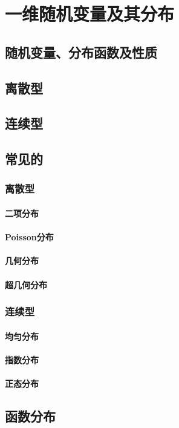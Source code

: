 \chapter{一维随机变量及其分布}

\section{随机变量、分布函数及性质}
\label{sec:随机变量_分布函数及性质}

\section{离散型}
\label{sec:离散型}

\section{连续型}
\label{sec:连续型}

\section{常见的}
\label{sec:常见的}

\subsection{离散型}
\label{sub:离散型}

\subsubsection{二项分布}
\label{ssub:二项分布}

\subsubsection{Poisson分布}
\label{ssub:poisson分布}

\subsubsection{几何分布}
\label{ssub:几何分布}

\subsubsection{超几何分布}
\label{ssub:超几何分布}

\subsection{连续型}
\label{sub:连续型}

\subsubsection{均匀分布}
\label{ssub:均匀分布}

\subsubsection{指数分布}
\label{ssub:指数分布}

\subsubsection{正态分布}
\label{ssub:正态分布}

\section{函数分布}
\label{sec:函数分布}


